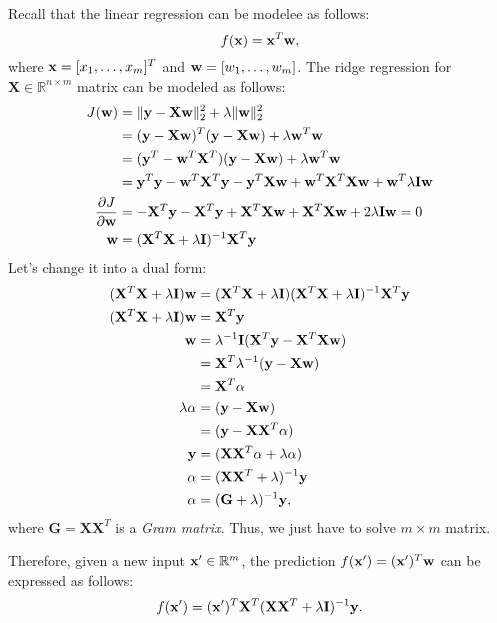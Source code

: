 Recall that the linear regression can be modelee as follows:
$$f({\mathbf{x}}) = {\mathbf{x}}^T{\mathbf{w}},$$
where ${\mathbf{x}} = [x_1, \dots, x_m]^T$ and ${\mathbf{w}} = [w_1,\dots,w_m]$. The ridge regression for $\mathbf{X}\in \mathbb{R}^{n\times m}$ matrix can be modeled as follows:
\begin{align}
	J({\mathbf{w}}) &= \|\mathbf{y}-\mathbf{X}{\mathbf{w}}\|^2_2 + \lambda \|{\mathbf{w}}\|^2_2 \\
			&= (\mathbf{y}-\mathbf{X}{\mathbf{w}})^T(\mathbf{y}-\mathbf{X}{\mathbf{w}})+\lambda{\mathbf{w}}^T{\mathbf{w}}\\
			&= (\mathbf{y}^T-{\mathbf{w}}^T\mathbf{X}^T)(\mathbf{y}-\mathbf{X}{\mathbf{w}})+\lambda{\mathbf{w}}^T{\mathbf{w}}\\
			&= {\mathbf{y}}^T{\mathbf{y}}-{\mathbf{w}}^T\mathbf{X}^T{\mathbf{y}}-{\mathbf{y}}^T\mathbf{X}{\mathbf{w}}+{\mathbf{w}}^T\mathbf{X}^T\mathbf{X}{\mathbf{w}}+{\mathbf{w}}^T\lambda\mathbf{I}{\mathbf{w}}\\
	\frac{\partial J}{\partial {\mathbf{w}}}&= -\mathbf{X}^T{\mathbf{y}}-\mathbf{X}^T{\mathbf{y}}+\mathbf{X}^T\mathbf{X}{\mathbf{w}}+\mathbf{X}^T\mathbf{X}{\mathbf{w}}+2\lambda\mathbf{I}{\mathbf{w}} = 0\\
	{\mathbf{w}}	&= (\mathbf{X}^T\mathbf{X}+\lambda\mathbf{I})^{-1}\mathbf{X}^T{\mathbf{y}}
	\label{eq:ridge_regression}
\end{align}
Let's change it into a dual form:
\begin{align}
	(\mathbf{X}^T\mathbf{X}+\lambda\mathbf{I}){\mathbf{w}}	&= (\mathbf{X}^T\mathbf{X}+\lambda\mathbf{I})(\mathbf{X}^T\mathbf{X}+\lambda\mathbf{I})^{-1}\mathbf{X}^T{\mathbf{y}}\\
	(\mathbf{X}^T\mathbf{X}+\lambda\mathbf{I}){\mathbf{w}} &= \mathbf{X}^T{\mathbf{y}}\\ 
	{\mathbf{w}} &= \lambda^{-1}\mathbf{I}(\mathbf{X}^T{\mathbf{y}}-\mathbf{X}^T\mathbf{X}{\mathbf{w}})\\
	&= \mathbf{X}^T\lambda^{-1}({\mathbf{y}}-\mathbf{X}{\mathbf{w}})\\
	&= \mathbf{X}^T\alpha\\
	\lambda\alpha &= ({\mathbf{y}}-\mathbf{X}{\mathbf{w}})\\
	&= ({\mathbf{y}}-\mathbf{X}\mathbf{X}^T\alpha)\\
	{\mathbf{y}} &= (\mathbf{X}\mathbf{X}^T\alpha+\lambda\alpha)\\
	\alpha &= (\mathbf{X}\mathbf{X}^T+\lambda)^{-1}{\mathbf{y}}\\
	\alpha &= (\mathbf{G}+\lambda)^{-1}{\mathbf{y}},
	\label{eq:dual_regression}
\end{align}
where $\mathbf{G} = \mathbf{X}\mathbf{X}^T$ is a \textit{Gram matrix}. Thus, we just have to solve $m\times m$ matrix. 

Therefore, given a new input ${\mathbf{x}}'\in \mathbb{R}^m$, the prediction $f({\mathbf{x}}') = ({\mathbf{x}}')^T{\mathbf{w}} $ can be expressed as follows:
$$f({\mathbf{x}}') = ({\mathbf{x}}')^T\mathbf{X}^T(\mathbf{X}\mathbf{X}^T+\lambda\mathbf{I})^{-1}{\mathbf{y}}.$$


